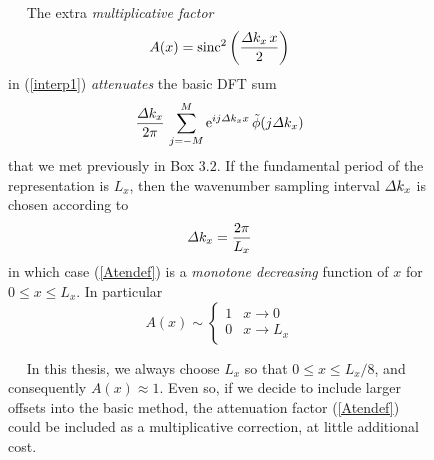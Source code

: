 \begin{figure}
{\begin{minipage} {142.0mm}
$\quad$ The extra {\em multiplicative factor\/}
\[
A(x)=\mbox{sinc}^{2}\left(\frac{{\mit \Delta} {  k}_{  x}\, x}{2}\right)
\] 
in (\ref{interp1}) {\em attenuates \/} the basic DFT sum 
\begin{equation} \label{Atendef}
{\frac{{\mit \Delta} {  k}_{  x}}{2 \pi }}\,
\sum\limits_{  j=-M}^{  M} {\rm e}^{i j {\mit \Delta} {  
k}_{  x} x}\,\tilde{ \phi 
}(j {\mit \Delta} {  k}_{  x}  )
\end{equation}
that we met previously in {\sc Box } $3.2$. If the fundamental period 
 of the representation is $L_x$, then the wavenumber sampling interval
 ${\mit \Delta} {  k}_{  x}$ is chosen according to
\[
{\mit \Delta} {  k}_{  x} =\frac{2 \pi }{L_x}
\] 
in which case (\ref{Atendef}) is a {\em monotone decreasing \/}  function of $x$ for $ 0 
\le x \le L_x$. In particular 
\[
A(x)\sim \left\{ \begin{array}{cc}  1 &x \rightarrow 0 \\ 0 & x 
\rightarrow L_x  \end{array}\right.
\]

$\quad$ In this thesis, we always choose $L_x$ so that $0 \le x 
\le L_x/8$, and consequently $A(x)\approx 1$. Even so, if we decide to 
include larger offsets into the basic method, 
the attenuation factor (\ref{Atendef}) could be included as a  
multiplicative correction, at little additional cost. 
\vspace{3mm}
\end{minipage}
}
\end{figure}


